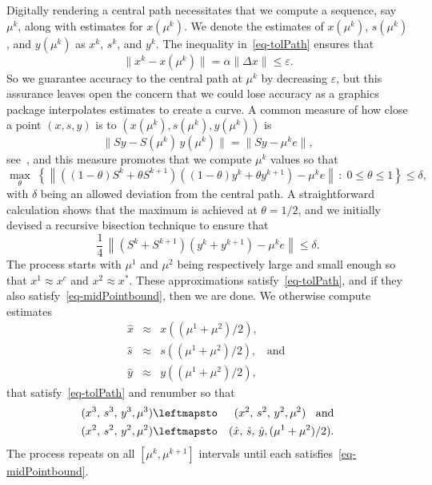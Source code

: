 \documentclass{article}
\def\xh{\hat{x}}
\def\yh{\hat{y}}
\def\sh{\hat{s}}
\begin{document}
Digitally rendering a central path necessitates that we compute
a sequence, say $\mu^k$, along with estimates for $x(\mu^k)$.
We denote the estimates of $x(\mu^k)$, $s(\mu^k)$, and
$y(\mu^k)$ as $x^k$, $s^k$, and $y^k$. The inequality in~\eqref{eq-tolPath} 
ensures that 
\[
\| x^k - x(\mu^k)\| = \alpha \| \Delta x \| \le \varepsilon.
\]
So we guarantee accuracy to the central path at $\mu^k$ by decreasing 
$\varepsilon$, but this assurance leaves open the concern that we could
lose accuracy as a graphics package interpolates estimates to create a
curve. A common measure of how close a point $(x, s, y)$ is
to $(x(\mu^k), s(\mu^k), y(\mu^k))$ is
\begin{equation} \label{eq-standardMetric}
\| Sy - S(\mu^k) \, y(\mu^k) \| = \| Sy - \mu^k e \|,
\end{equation}
see~\cite{vavasis96}, and this measure promotes that we compute 
$\mu^k$ values so that
\[
\max_{\theta} \; \left\{
\left\| \left( (1 - \theta)S^k + \theta S^{k+1} \right)
        \left( (1 - \theta)y^k + \theta y^{k+1} \right)
        - \mu^k e \right\| \, : \; 0 \le \theta \le 1 \right\}
        \le \delta,
\]
with $\delta$ being an allowed deviation from the central path. A straightforward
calculation shows that the maximum is achieved at $\theta = 1/2$, and we initially
devised a recursive bisection technique to ensure that
\begin{equation} \label{eq-midPointbound}
\frac{1}{4} \, 
\left\| \left( S^k + S^{k+1} \right) \left( y^k + y^{k+1} \right)
        - \mu^k e \right\| \le \delta.
\end{equation}
The process starts with $\mu^1$ and $\mu^2$ being respectively large and small
enough so that $x^1 \approx x^c$ and $x^2 \approx x^*$. These approximations
satisfy~\eqref{eq-tolPath}, and if they also satisfy~\eqref{eq-midPointbound},
then we are done. We otherwise compute estimates 
\begin{eqnarray*}
\xh & \approx & x( (\mu^1 + \mu^2) / 2), \\
\sh & \approx & s( (\mu^1 + \mu^2) / 2), \;\; \mbox{ and } \\
\yh & \approx & y( (\mu^1 + \mu^2) / 2),
\end{eqnarray*}
that satisfy~\eqref{eq-tolPath} and renumber so that
\begin{eqnarray*}
(x^3, \, s^3, \, y^3, \mu^3) & \leftmapsto &  (x^2, \, s^2, \, y^2, \mu^2) \;\; \mbox{ and} \\
(x^2, \, s^2, \, y^2, \mu^2) & \leftmapsto &  (\xh, \, \sh, \, \yh, (\mu^1 + \mu^2) /2 ).
\end{eqnarray*}
The process repeats on all $[\mu^k, \mu^{k+1}]$ intervals until each
satisfies~\eqref{eq-midPointbound}.
\end{document}
